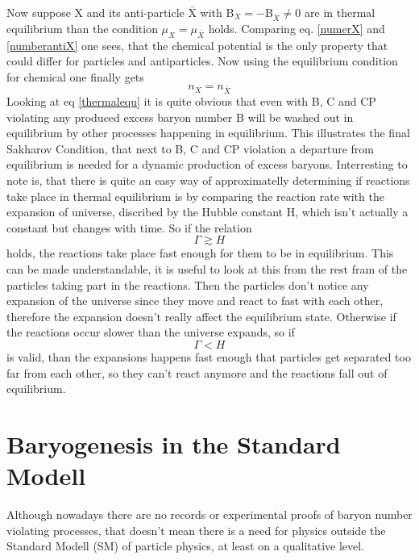 Now suppose X and its anti-particle $\bar{\text{X}}$  with B$_X=-$B$_{\bar{X}}\neq0$ are in thermal equilibrium than the condition $\mu_X=\mu_{\bar{X}}$ holds. Comparing eq. \ref{numerX} and \ref{numberantiX} one sees, that the chemical potential is the only property that could differ for particles and antiparticles. Now using the equilibrium condition for chemical one finally gets
\begin{equation}
	n_X=n_{\bar{X}}
	\label{thermalequ}
\end{equation}
Looking at eq \ref{thermalequ} it is quite obvious that even with B, C and CP violating any produced excess baryon number B will be washed out in equilibrium by other processes happening in equilibrium. \newline
This illustrates the final Sakharov Condition, that next to B, C and CP violation a departure from equilibrium is needed for a dynamic production of excess baryons. \newline
Interresting to note is, that there is quite an easy way of approximatelly determining if reactions take place in thermal equilibrium is by comparing the reaction rate with the expansion of universe, discribed by the Hubble constant H, which isn't actually a constant but changes with time. So if the relation 
\begin{equation}
	\Gamma\gtrsim H
	\label{rate_g_hubble}
\end{equation}
holds, the reactions take place fast enough for them to be in equilibrium. This can be made understandable, it is useful to look at this from the rest fram of the particles taking part in the reactions. Then the particles don't notice any expansion of the universe since they move and react to fast with each other, therefore the expansion doesn't really affect the equilibrium state. \newline
Otherwise if the reactions occur slower than the universe expands, so if 
\begin{equation}
	\Gamma<H
\end{equation}
is valid, than the expansions happens fast enough that particles get separated too far from each other, so they can't react anymore and the reactions fall out of equilibrium.
\section{Baryogenesis in the Standard Modell}
Although nowadays there are no records or experimental proofs of baryon number violating processes, that doesn't mean there is a need for physics outside the Standard Modell (SM) of particle physics, at least on a qualitative level.
